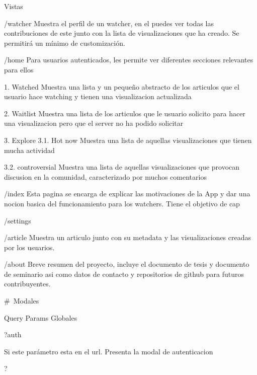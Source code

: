 


Vistas


/watcher
Muestra el perfil de un watcher, en el puedes ver todas las contribuciones de este junto con la lista de visualizaciones que ha creado.
Se permitirá un mínimo de customización.


/home
Para usuarios autenticados, les permite ver diferentes secciones relevantes para ellos

1. Watched
    Muestra una lista y un pequeño abstracto de los articulos que el usuario hace watching y tienen una visualizacion actualizada

2. Waitlist
    Muestra una lista de los articulos que le usuario solicito para hacer una visualizacion pero que el server no ha podido solicitar

3. Explore
    3.1. Hot now
    Muestra una lista de aquellas visualizaciones que tienen mucha actividad 

    3.2. controversial
    Muestra una lista de aquellas visualizaciones que provocan discusion en la comunidad, caracterizado por muchos comentarios


/index
Esta pagina se encarga de explicar las motivaciones de la App y dar una nocion basica del funcionamiento para los watchers.
Tiene el objetivo de cap


/settings



/article
Muestra un articulo junto con su metadata y las visualizaciones creadas por los usuarios.



/about
Breve resumen del proyecto, incluye el documento de tesis y documento de seminario asi como datos de contacto y repositorios de github para futuros contribuyentes.

# Modales

Query Params Globales

?auth

Si este parámetro esta en el url. Presenta la modal de autenticacion 

?

